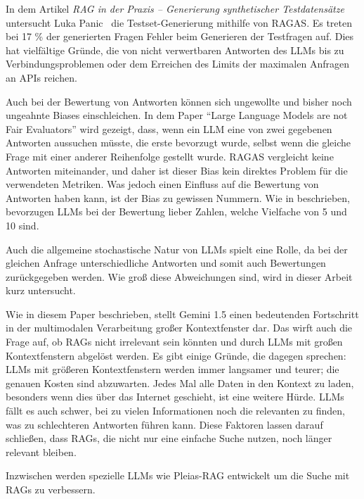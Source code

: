 In dem Artikel \textit{RAG in der Praxis – Generierung synthetischer Testdatensätze} untersucht Luka Panic~\cite{pixion2024rag} die Testset-Generierung mithilfe von RAGAS. Es treten bei 17 \% der generierten Fragen Fehler beim Generieren der Testfragen auf.
Dies hat vielfältige Gründe, die von nicht verwertbaren Antworten des LLMs bis zu Verbindungsproblemen oder dem Erreichen des Limits der maximalen Anfragen an APIs reichen.

Auch bei der Bewertung von Antworten können sich ungewollte und bisher noch ungeahnte Biases einschleichen. In dem Paper \enquote{Large Language Models are not Fair Evaluators} \cite{yang2023llmfairness} wird gezeigt, dass, wenn ein LLM eine von zwei gegebenen Antworten aussuchen müsste, die erste bevorzugt wurde, selbst wenn die gleiche Frage mit einer anderer Reihenfolge gestellt wurde.
RAGAS vergleicht keine Antworten miteinander, und daher ist dieser Bias kein direktes Problem für die verwendeten Metriken. Was jedoch einen Einfluss auf die Bewertung von Antworten haben kann, ist der Bias zu gewissen Nummern.
Wie in \cite{shaikh2024cbeval} beschrieben, bevorzugen LLMs bei der Bewertung lieber Zahlen, welche Vielfache von 5 und 10 sind.

Auch die allgemeine stochastische Natur von LLMs spielt eine Rolle, da bei der gleichen Anfrage unterschiedliche Antworten und somit auch Bewertungen zurückgegeben werden. Wie groß diese Abweichungen sind, wird in dieser Arbeit kurz untersucht.

Wie in diesem Paper \cite{gemini2024v15} beschrieben, stellt Gemini 1.5 einen bedeutenden Fortschritt in der multimodalen Verarbeitung großer Kontextfenster dar. Das wirft auch die Frage auf, ob RAGs nicht irrelevant sein könnten und durch LLMs mit großen Kontextfenstern abgelöst werden.
Es gibt einige Gründe, die dagegen sprechen: LLMs mit größeren Kontextfenstern werden immer langsamer und teurer; die genauen Kosten sind abzuwarten. Jedes Mal alle Daten in den Kontext zu laden, besonders wenn dies über das Internet geschieht, ist eine weitere Hürde. LLMs fällt es auch schwer, bei zu vielen Informationen noch die relevanten zu finden, was zu schlechteren Antworten führen kann.
Diese Faktoren lassen darauf schließen, dass RAGs, die nicht nur eine einfache Suche nutzen, noch länger relevant bleiben.

Inzwischen werden spezielle LLMs wie Pleias-RAG entwickelt um die Suche mit RAGs zu verbessern. \cite{huggingface_pleias_rag_1b}

